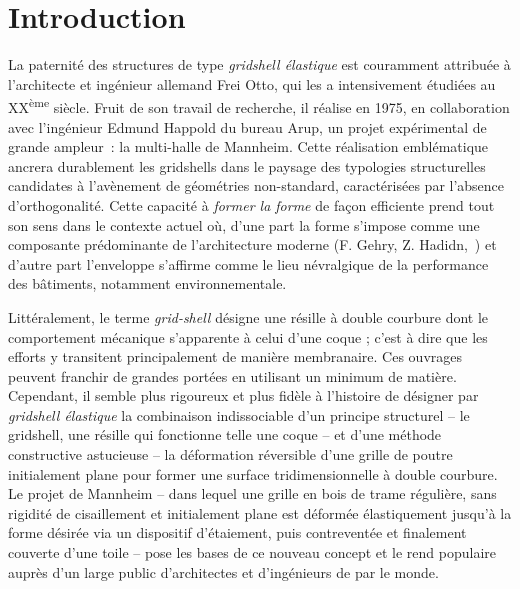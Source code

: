 




\chapter{Introduction}\label{chp:intro}

La paternité des structures de type \emph{gridshell élastique} est couramment attribuée à l'architecte et ingénieur allemand Frei Otto, qui les a intensivement étudiées au XX\textsuperscript{ème} siècle. Fruit de son travail de recherche, il réalise en 1975, en collaboration avec l'ingénieur Edmund Happold du bureau Arup, un projet expérimental de grande ampleur~: la multi-halle de Mannheim. Cette réalisation emblématique ancrera durablement les gridshells dans le paysage des typologies structurelles candidates à l'avènement de géométries non-standard, caractérisées par l'absence d'orthogonalité. Cette capacité à \emph{former la forme} de façon efficiente prend tout son sens dans le contexte actuel où, d'une part la forme s'impose comme une composante prédominante de l'architecture moderne (F. Gehry, Z. Hadidn,~\telp{}) et d'autre part l'enveloppe s'affirme comme le lieu névralgique de la performance des bâtiments, notamment environnementale.

Littéralement, le terme \emph{grid-shell} désigne une résille à double courbure dont le comportement mécanique s'apparente à celui d'une coque ; c'est à dire que les efforts y transitent principalement de manière membranaire. Ces ouvrages peuvent franchir de grandes portées en utilisant un minimum de matière. Cependant, il semble plus rigoureux et plus fidèle à l'histoire de désigner par \emph{gridshell élastique} la combinaison indissociable d'un principe structurel -- le gridshell, une résille qui fonctionne telle une coque -- et d'une méthode constructive astucieuse -- la déformation réversible d'une grille de poutre initialement plane pour former une surface tridimensionnelle à double courbure. Le projet de Mannheim -- dans lequel une grille en bois de trame régulière, sans rigidité de cisaillement et initialement plane est déformée élastiquement jusqu'à la forme désirée via un dispositif d'étaiement, puis contreventée et finalement couverte d'une toile -- pose les bases de ce nouveau concept et le rend populaire auprès d'un large public d'architectes et d'ingénieurs de par le monde.

